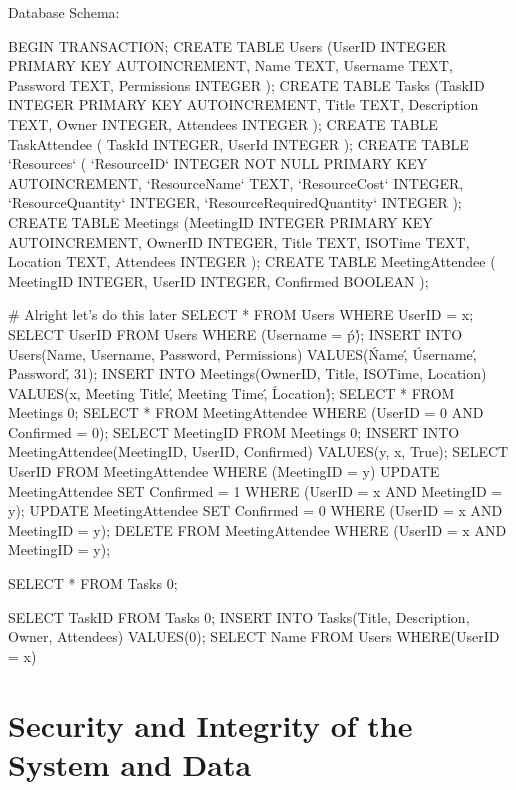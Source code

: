     Database Schema:
\begin{sql}
    BEGIN TRANSACTION;
CREATE TABLE Users
                (UserID INTEGER PRIMARY KEY AUTOINCREMENT,
                Name TEXT,
                Username TEXT,
                Password TEXT,
                Permissions INTEGER
                );
CREATE TABLE Tasks
                (TaskID INTEGER PRIMARY KEY AUTOINCREMENT,
                Title TEXT,
                Description TEXT,
                Owner INTEGER,
                Attendees INTEGER
                );
CREATE TABLE TaskAttendee
                (
                TaskId INTEGER,
                UserId INTEGER
                );
CREATE TABLE `Resources` (
	`ResourceID`	INTEGER NOT NULL PRIMARY KEY AUTOINCREMENT,
	`ResourceName`	TEXT,
	`ResourceCost`	INTEGER,
	`ResourceQuantity`	INTEGER,
	`ResourceRequiredQuantity`	INTEGER
);
CREATE TABLE Meetings
                (MeetingID INTEGER PRIMARY KEY AUTOINCREMENT,
                OwnerID INTEGER,
                Title TEXT,
                ISOTime TEXT,
                Location TEXT,
                Attendees INTEGER
                );
CREATE TABLE MeetingAttendee
(
    MeetingID INTEGER,
    UserID INTEGER,
    Confirmed BOOLEAN
);


# Alright let's do this later
SELECT * FROM Users WHERE UserID = x;
SELECT UserID FROM Users WHERE (Username = \'p\');
INSERT INTO Users(Name, Username, Password, Permissions) VALUES(\'Name\', \'Username\', \'Password\', 31);
INSERT INTO Meetings(OwnerID, Title, ISOTime, Location) VALUES(x, \'Meeting Title\', \'Meeting Time\',  \'Location\');
SELECT * FROM Meetings {0};
SELECT * FROM MeetingAttendee WHERE (UserID = {0} AND Confirmed = 0);
SELECT MeetingID FROM Meetings {0};
INSERT INTO MeetingAttendee(MeetingID, UserID, Confirmed) VALUES(y, x, True);
SELECT UserID FROM MeetingAttendee WHERE (MeetingID = y)
UPDATE MeetingAttendee SET Confirmed = 1 WHERE (UserID = x AND MeetingID = y);
UPDATE MeetingAttendee SET Confirmed = 0 WHERE (UserID = x AND MeetingID = y);
DELETE FROM MeetingAttendee WHERE (UserID = x AND MeetingID = y);

SELECT * FROM Tasks {0};

SELECT TaskID FROM Tasks {0};
INSERT INTO Tasks(Title, Description, Owner, Attendees) VALUES({0});
SELECT Name FROM Users WHERE(UserID = x)

\end{sql}

\section{Security and Integrity of the System and Data}

